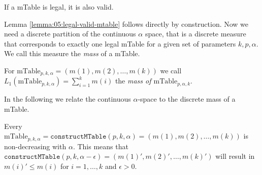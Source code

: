%
\begin{lemma}
	\label{lemma:05:legal-valid-mtable}
	If a mTable is legal, it is also valid.
\end{lemma}
%
\noindent Lemma \ref{lemma:05:legal-valid-mtable} follows directly by construction.
%
Now we need a discrete partition of the continuous $\alpha$ space, that is a discrete measure that corresponds to exactly one legal mTable for a given set of parameters $k,p,\alpha$.
%
We call this measure the \emph{mass} of a mTable.
%
%
%
%
\begin{definition}
	\label{def:05:Mass of a MTable}
	For $\text{mTable}_{p,k,\alpha}=(m(1) , m(2) , \ldots , m(k))$ we call\\
	$L_1(\text{mTable}_{p,k,\alpha})=\sum_{i=1}^k m(i)$ the \textit{mass of $\text{mTable}_{p,\alpha,k}$}.
\end{definition}
%
In the following we relate the continuous $\alpha$-space to the discrete mass of a mTable.
%
\begin{lemma}
	\label{lemma:05:non-decreasing-with-alpha-mtable}
	Every $\text{mTable}_{p,k,\alpha}=\texttt{constructMTable}(p,k,\alpha)=(m(1) , m(2) , \ldots , m(k))$ is non-decreasing with $\alpha$. This means that
	$\texttt{constructMTable}(p,k,\alpha - \epsilon) = (m(1)' , m(2)' , \ldots , m(k)')$ will result in $m(i)' \leq m(i)$ for $i=1,\ldots,k$ and $\epsilon > 0$.
\end{lemma}
